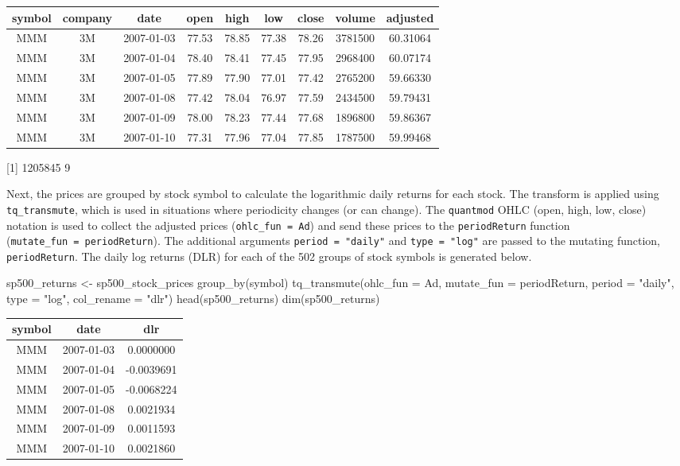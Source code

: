 \begin{tabular}{ccccccccc}
\toprule
symbol & company & date & open & high & low & close & volume & adjusted\\
\midrule
MMM & 3M & 2007-01-03 & 77.53 & 78.85 & 77.38 & 78.26 & 3781500 & 60.31064\\
MMM & 3M & 2007-01-04 & 78.40 & 78.41 & 77.45 & 77.95 & 2968400 & 60.07174\\
MMM & 3M & 2007-01-05 & 77.89 & 77.90 & 77.01 & 77.42 & 2765200 & 59.66330\\
MMM & 3M & 2007-01-08 & 77.42 & 78.04 & 76.97 & 77.59 & 2434500 & 59.79431\\
MMM & 3M & 2007-01-09 & 78.00 & 78.23 & 77.44 & 77.68 & 1896800 & 59.86367\\
MMM & 3M & 2007-01-10 & 77.31 & 77.96 & 77.04 & 77.85 & 1787500 & 59.99468\\
\bottomrule
\end{tabular}

{[}1{]} 1205845 9

\hspace{20 mm}

Next, the prices are grouped by stock symbol to calculate the
logarithmic daily returns for each stock. The transform is applied using
\texttt{tq\_transmute}, which is used in situations where periodicity
changes (or can change). The \texttt{quantmod} OHLC (open, high, low,
close) notation is used to collect the adjusted prices
(\texttt{ohlc\_fun\ =\ Ad}) and send these prices to the
\texttt{periodReturn} function (\texttt{mutate\_fun\ =\ periodReturn}).
The additional arguments \texttt{period\ =\ "daily"} and
\texttt{type\ =\ "log"} are passed to the mutating function,
\texttt{periodReturn}. The daily log returns (DLR) for each of the 502
groups of stock symbols is generated below.

\begin{Schunk}
\begin{Sinput}
sp500_returns <- sp500_stock_prices %
    group_by(symbol) %
    tq_transmute(ohlc_fun = Ad, mutate_fun = periodReturn, 
                 period = "daily", type = "log", col_rename = "dlr")
head(sp500_returns)
dim(sp500_returns)
\end{Sinput}
\end{Schunk}

\begin{tabular}{ccc}
\toprule
symbol & date & dlr\\
\midrule
MMM & 2007-01-03 & 0.0000000\\
MMM & 2007-01-04 & -0.0039691\\
MMM & 2007-01-05 & -0.0068224\\
MMM & 2007-01-08 & 0.0021934\\
MMM & 2007-01-09 & 0.0011593\\
MMM & 2007-01-10 & 0.0021860\\
\bottomrule
\end{tabular}

